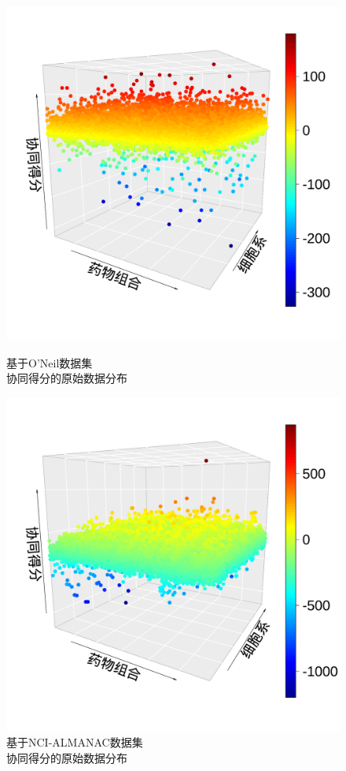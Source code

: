 \begin{figure}
\centering
  \begin{minipage}{0.45\linewidth}
    \centering
    \includegraphics[width=\linewidth]{figures/old_o.pdf}
    \caption{基于O'Neil数据集\\协同得分的原始数据分布}
    \label{fig:sub1}
  \end{minipage}%
  \begin{minipage}{0.45\linewidth}
    \centering
    \includegraphics[width=\linewidth]{figures/new_o.pdf}
    \caption{基于NCI-ALMANAC数据集\\协同得分的原始数据分布}
    \label{fig:sub3}
  \end{minipage}
\end{figure}

